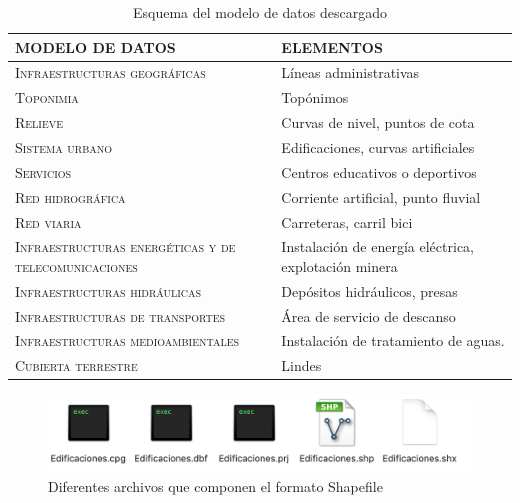 \begin{enumerate}
	
	\begin{table}[H]
		\caption{Esquema del modelo de datos descargado}
		\label{elementos-mapas}
		\centering
		\begin{tabular}{|m{6.2cm}|m{5.4cm}|}
			\hline
			\rowcolor[HTML]{EFEFEF} 
			\textbf{MODELO DE DATOS} & \textbf{ELEMENTOS} \\ \hline
			\textsc{Infraestructuras geográficas}&  Líneas administrativas            \\ \hline
			\textsc{Toponimia}&              Topónimos      \\ \hline
			\textsc{Relieve}&         Curvas de nivel, puntos de cota           \\ \hline
			\textsc{Sistema urbano}&       Edificaciones, curvas artificiales             \\ \hline
			\textsc{Servicios}&       Centros educativos o deportivos             \\ \hline
			\textsc{Red hidrográfica}&       Corriente artificial, punto fluvial  \\ \hline
			\textsc{Red viaria}&      Carreteras, carril bici              \\ \hline
			\textsc{Infraestructuras energéticas y de telecomunicaciones}&     Instalación de energía eléctrica, explotación minera               \\ \hline
			\textsc{Infraestructuras hidráulicas}&     Depósitos hidráulicos, presas               \\ \hline
			\textsc{Infraestructuras de transportes} &         Área de servicio de descanso       \\ \hline
			\textsc{Infraestructuras medioambientales} &     Instalación de tratamiento de aguas.               \\ \hline
			\textsc{Cubierta terrestre}&           Lindes        \\ \hline
		\end{tabular}
	\end{table}
	
		\begin{figure}[H]
		\centering
		\includegraphics[width=1\linewidth]{imagenes/capitulo2/shapefile}
		\caption{Diferentes archivos que componen el formato Shapefile }
		\label{fig:shapefile}
	\end{figure}
	

\end{enumerate}
